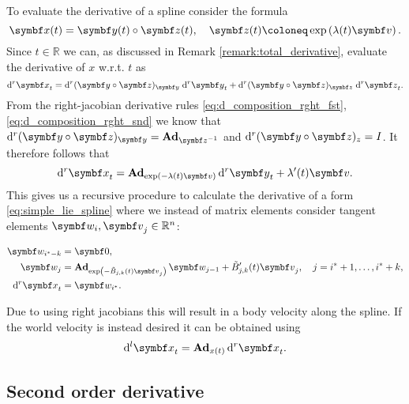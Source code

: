 To evaluate the derivative of a spline consider the formula
\begin{equation}
  \x(t) = \y(t) \circ \z(t), \quad \z(t) \coloneq \exp \left( \lambda(t) \bv \right).
\end{equation}
Since $t \in \mathbb{R}$ we can, as discussed in Remark \ref{remark:total_derivative}, evaluate the derivative of $x$ w.r.t. $t$ as
\begin{equation}
  \mathrm{d}^r \x_t = \mathrm{d}^r (\y \circ \z)_\y \; \mathrm{d}^r \y_t + \mathrm{d}^r (\y \circ \z)_\z \; \mathrm{d}^r \z_t.
\end{equation}
From the right-jacobian derivative rules \eqref{eq:d_composition_rght_fst}, \eqref{eq:d_composition_rght_snd} we know that $\mathrm{d}^r (\y \circ \z)_\y = \bAd_{\z^{-1}}$ and $\mathrm{d}^r (\y \circ \z)_z = I$. It therefore follows that
\begin{equation}
  \mathrm{d}^r \x_t = \bAd_{\exp(-\lambda(t) \bv)} \mathrm{d}^r \y_t + \lambda'(t) \bv.
\end{equation}
This gives us a recursive procedure to calculate the derivative of a form \eqref{eq:simple_lie_spline} where we instead of matrix elements consider tangent elements $\symbf w_i, \bv_j \in \mathbb{R}^n$:
\begin{important}
  \begin{equation}
    \label{eq:bspline_dx_dt}
    \begin{aligned}
      \symbf w_{i^* - k}    & = \symbf 0,                                                                                                                         \\
      \symbf w_{j}      & = \bAd_{\exp \left( - \tilde B_{j, k}(t) \bv_j \right)} \symbf w_{j-1} + \tilde B_{j, k}'(t) \bv_j, \quad j = i^*+1, \ldots, i^*+k, \\
      \mathrm{d}^r \x_t & = \symbf w_{i^*}.
    \end{aligned}
  \end{equation}
\end{important}
Due to using right jacobians this will result in a body velocity along the spline. If the world velocity is instead desired it can be obtained using
\begin{equation}
  \mathrm{d}^l \x_t = \bAd_{x(t)} \mathrm{d}^r \x_t.
\end{equation}

\subsection{Second order derivative}


